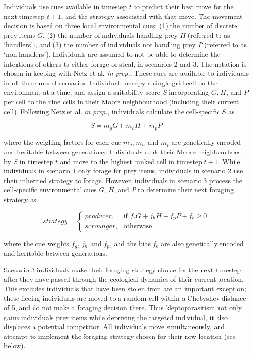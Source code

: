 \documentclass[11pt]{article}
\begin{document}
Individuals use cues available in timestep $t$ to predict their best move for the next timestep $t+1$, and the strategy associated with that move.
The movement decision is based on three local environmental cues: (1) the number of discrete prey items $G$, (2) the number of individuals handling  prey $H$ (referred to as `handlers'), and (3) the number of individuals not handling prey $P$ (referred to as `non-handlers').
Individuals are assumed to not be able to determine the intentions of others to either forage or steal, in scenarios 2 and 3.
The notation is chosen in keeping with Netz et al. \textit{in prep.}.
These cues are available to individuals in all three model scenarios.
Individuals occupy a single grid cell on the environment at a time, and assign a suitability score $S$ incorporating $G$, $H$, and $P$ per cell to the nine cells in their Moore neighbourhood (including their current cell).
Following Netz et al. \textit{in prep.}, individuals calculate the cell-specific $S$ as
\begin{linenomath*}
    \begin{equation}
        S = m_gG + m_hH + m_pP
    \end{equation}
\end{linenomath*}
where the weighing factors for each cue $m_g$, $m_h$ and $m_p$ are genetically encoded and heritable between generations.
Individuals rank their Moore neighbourhood by $S$ in timestep $t$ and move to the highest ranked cell in timestep $t+1$.
While individuals in scenario 1 only forage for prey items, individuals in scenario 2 use their inherited strategy to forage.
However, individuals in scenario 3 process the cell-specific environmental cues $G$, $H$, and $P$ to determine their next foraging strategy as
\begin{linenomath*}
    \begin{equation}
        strategy = 
    \begin{cases}
        {producer},& \text{if } f_gG + f_hH + f_pP + f_b \geq 0\\
        {scrounger},              & \text{otherwise}
    \end{cases}
    \end{equation}
\end{linenomath*}
where the cue weights $f_g$, $f_h$ and $f_p$, and the bias $f_b$ are also genetically encoded and heritable between generations.

Scenario 3 individuals make their foraging strategy choice for the next timestep after they have passed through the ecological dynamics of their current location.
This excludes individuals that have been stolen from are an important exception; these fleeing individuals are moved to a random cell within a Chebyshev distance of 5, and do not make a foraging decision there.
Thus kleptoparasitism not only gains individuals prey items while depriving the targeted individual, it also displaces a potential competitor.
All individuals move simultaneously, and attempt to implement the foraging strategy chosen for their new location (see below).
\end{document}

